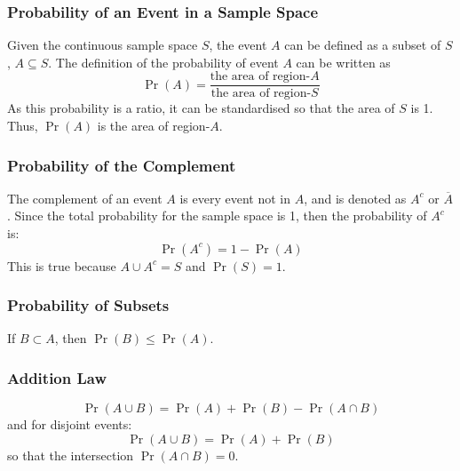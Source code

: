\documentclass{article}
\begin{document}
\subsubsection{Probability of an Event in a Sample Space}
Given the continuous sample space \(S\), the event \(A\) can be defined
as a subset of \(S\), \(A \subseteq S\). The definition of the
probability of event \(A\) can be written as
\begin{equation*}
    \Pr{\left( A \right)} = \frac{\text{the area of region-\(A\)}}{\text{the area of region-\(S\)}}
\end{equation*}
As this probability is a ratio, it can be standardised so that the area
of \(S\) is 1. Thus, \(\Pr{\left( A \right)}\) is the area of
region-\(A\).
\subsubsection{Probability of the Complement}
The complement of an event \(A\) is every event not in \(A\), and is
denoted as \(A^c\) or \(\overline{A}\). Since the total probability for
the sample space is 1, then the probability of \(A^c\) is:
\begin{equation*}
    \Pr{\left( A^c \right)} = 1 - \Pr{\left( A \right)}
\end{equation*}
This is true because \(A \cup A^c = S\) and \(\Pr{\left( S \right)} = 1\).
\subsubsection{Probability of Subsets}
If \(B \subset A\), then \(\Pr{\left( B \right)} \leq \Pr{\left( A
\right)}\).
\subsubsection{Addition Law}
\begin{equation*}
    \Pr{\left( A \cup B \right)} = \Pr{\left( A \right)} + \Pr{\left( B \right)} - \Pr{\left( A \cap B \right)}
\end{equation*}
and for disjoint events:
\begin{equation*}
    \Pr{\left( A \cup B \right)} = \Pr{\left( A \right)} + \Pr{\left( B \right)}
\end{equation*}
so that the intersection \(\Pr{\left( A \cap B \right)} = 0\).
\end{document}
